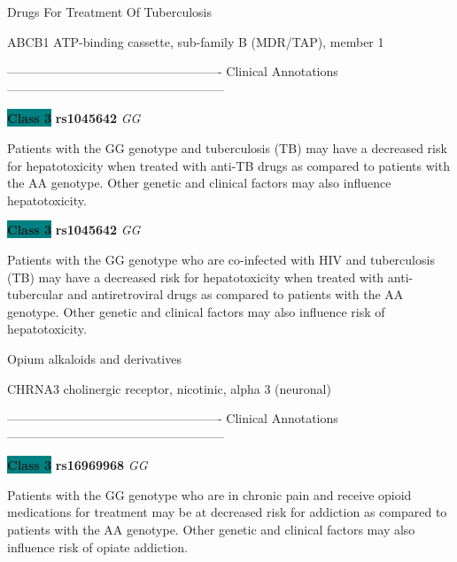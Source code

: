 \documentclass{resume} %
\begin{document}
\begin{rSection}{ Drugs For Treatment Of Tuberculosis }
\begin{rSubsection}{ ABCB1 }{ ATP-binding cassette, sub-family B (MDR/TAP), member 1 }{}{}
\item[]

\item[] ---------------------------------------------------- Clinical Annotations -----------------------------------------------------\newline
\item \textbf{\colorbox{teal} {Class 3}} \textbf{ rs1045642 } \textit{ GG }
\item[] Patients with the GG genotype and tuberculosis (TB) may have a decreased risk for hepatotoxicity when treated with anti-TB drugs as compared to patients with the AA genotype. Other genetic and clinical factors may also influence hepatotoxicity.\item \textbf{\colorbox{teal} {Class 3}} \textbf{ rs1045642 } \textit{ GG }
\item[] Patients with the GG genotype who are co-infected with HIV and tuberculosis (TB) may have a decreased risk for hepatotoxicity when treated with anti-tubercular and antiretroviral drugs as compared to patients with the AA genotype. Other genetic and clinical factors may also influence risk of hepatotoxicity.
\end{rSubsection}

\end{rSection}\begin{rSection}{ Opium alkaloids and derivatives }
\item[]

\begin{rSubsection}{ CHRNA3 }{ cholinergic receptor, nicotinic, alpha 3 (neuronal) }{}{}
\item[]

\item[] ---------------------------------------------------- Clinical Annotations -----------------------------------------------------\newline
\item \textbf{\colorbox{teal} {Class 3}} \textbf{ rs16969968 } \textit{ GG }
\item[] Patients with the GG genotype who are in chronic pain and receive opioid medications for treatment may be at decreased risk for addiction as compared to patients with the AA genotype. Other genetic and clinical factors may also influence risk of opiate addiction.
\end{rSubsection}


\end{rSection}
\end{document}
